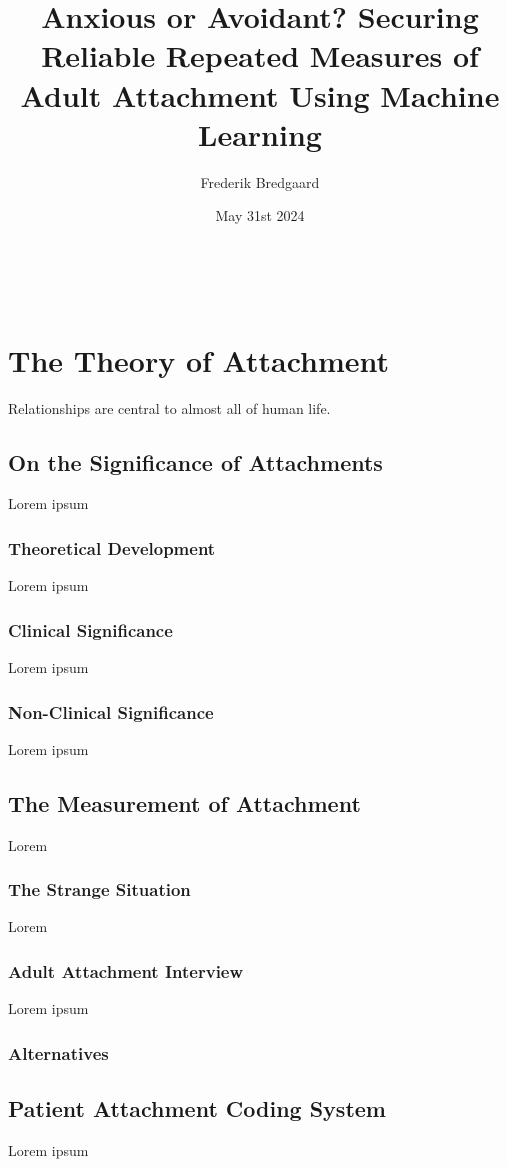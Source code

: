 \documentclass[12pt]{report}
\title{Anxious or Avoidant? Securing Reliable Repeated Measures of Adult Attachment Using Machine Learning}
\author{Frederik Bredgaard}
\date{May 31st 2024}
\begin{document}
\maketitle
\
\tableofcontents

\chapter{The Theory of Attachment}
Relationships are central to almost all of human life.

\section{On the Significance of Attachments}
Lorem ipsum

\subsection{Theoretical Development}
Lorem ipsum

\subsection{Clinical Significance}
Lorem ipsum

\subsection{Non-Clinical Significance}
Lorem ipsum

\section{The Measurement of Attachment}
Lorem

\subsection{The Strange Situation}
Lorem

\subsection{Adult Attachment Interview}
Lorem ipsum

\subsection{Alternatives}

\section{Patient Attachment Coding System}
Lorem ipsum \cite{Talia2017,Talia2020}
\end{document}
